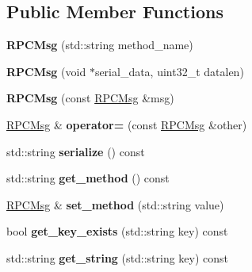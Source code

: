\subsection*{Public Member Functions}
\begin{DoxyCompactItemize}
\item 
\hypertarget{classwisc_1_1RPCMsg_a488e57db6c602998c3b0fc1f74396a6e}{
{\bfseries RPCMsg} (std::string method\_\-name)}
\label{classwisc_1_1RPCMsg_a488e57db6c602998c3b0fc1f74396a6e}

\item 
\hypertarget{classwisc_1_1RPCMsg_a788da80b0949284942bb0706c0f46941}{
{\bfseries RPCMsg} (void $\ast$serial\_\-data, uint32\_\-t datalen)}
\label{classwisc_1_1RPCMsg_a788da80b0949284942bb0706c0f46941}

\item 
\hypertarget{classwisc_1_1RPCMsg_a00c51aa96b705669a0c34c2a796a1f55}{
{\bfseries RPCMsg} (const \hyperlink{classwisc_1_1RPCMsg}{RPCMsg} \&msg)}
\label{classwisc_1_1RPCMsg_a00c51aa96b705669a0c34c2a796a1f55}

\item 
\hypertarget{classwisc_1_1RPCMsg_a7b13084aa921896be24916697a63425d}{
\hyperlink{classwisc_1_1RPCMsg}{RPCMsg} \& {\bfseries operator=} (const \hyperlink{classwisc_1_1RPCMsg}{RPCMsg} \&other)}
\label{classwisc_1_1RPCMsg_a7b13084aa921896be24916697a63425d}

\item 
\hypertarget{classwisc_1_1RPCMsg_a1dd8650697399b717cd276607633a035}{
std::string {\bfseries serialize} () const }
\label{classwisc_1_1RPCMsg_a1dd8650697399b717cd276607633a035}

\item 
\hypertarget{classwisc_1_1RPCMsg_af3f6bc565fc1b2c3d10d81cc7eaf8495}{
std::string {\bfseries get\_\-method} () const }
\label{classwisc_1_1RPCMsg_af3f6bc565fc1b2c3d10d81cc7eaf8495}

\item 
\hypertarget{classwisc_1_1RPCMsg_a9b7c1b29cddbc6901362d9935ee15ccd}{
\hyperlink{classwisc_1_1RPCMsg}{RPCMsg} \& {\bfseries set\_\-method} (std::string value)}
\label{classwisc_1_1RPCMsg_a9b7c1b29cddbc6901362d9935ee15ccd}

\item 
\hypertarget{classwisc_1_1RPCMsg_a4fb8724df31604aaff102ba336ebc1fa}{
bool {\bfseries get\_\-key\_\-exists} (std::string key) const }
\label{classwisc_1_1RPCMsg_a4fb8724df31604aaff102ba336ebc1fa}

\item 
\hypertarget{classwisc_1_1RPCMsg_af2f2e865055e3ceade08c890cf7bebfa}{
std::string {\bfseries get\_\-string} (std::string key) const }
\label{classwisc_1_1RPCMsg_af2f2e865055e3ceade08c890cf7bebfa}


\end{DoxyCompactItemize}
